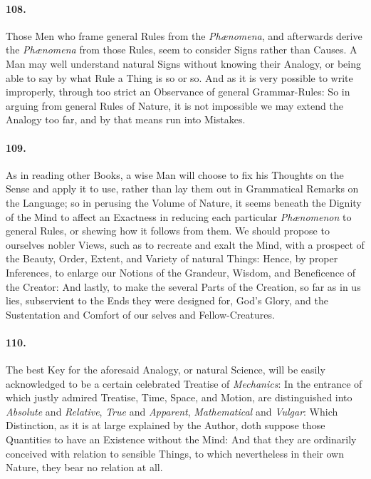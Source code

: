 \documentclass[]{article}
\newenvironment{sectionbody}{}{}
\begin{document}
\begin{sectionbody}
\paragraph{108.} Those Men who frame general Rules from the
\emph{Ph{\ae}nomena}, and afterwards derive the
\emph{Ph{\ae}nomena} from those Rules, seem to consider Signs
rather than Causes.  A Man may well understand natural Signs
without knowing their Analogy, or being able to say by what Rule
a Thing is so or so.  And as it is very possible to write
improperly, through too strict an Observance of general
Grammar-Rules: So in arguing from general Rules of Nature, it is
not impossible we may extend the Analogy too far, and by that
means run into Mistakes.



\paragraph{109.} As in reading other Books, a wise Man will choose to fix his
Thoughts on the Sense and apply it to use, rather than lay them
out in Grammatical Remarks on the Language; so in perusing the
Volume of Nature, it seems beneath the Dignity of the Mind to
affect an Exactness in reducing each particular
\emph{Ph{\ae}nomenon} to general Rules, or shewing how it
follows from them.  We should propose to ourselves nobler Views,
such as to recreate and exalt the Mind, with a prospect of the
Beauty, Order, Extent, and Variety of natural Things: Hence, by
proper Inferences, to enlarge our Notions of the Grandeur,
Wisdom, and Beneficence of the {\sc Creator}: And lastly, to make the
several Parts of the Creation, so far as in us lies, subservient
to the Ends they were designed for, {\sc God}'s Glory, and the
Sustentation and Comfort of our selves and Fellow-Creatures.



\paragraph{110.} The best Key for the aforesaid Analogy, or natural Science, will
be easily acknowledged to be a certain celebrated Treatise of
\emph{Mechanics}: In the entrance of which justly admired
Treatise, Time, Space, and Motion, are distinguished into
\emph{Absolute} and \emph{Relative}, \emph{True} and
\emph{Apparent}, \emph{Mathematical} and \emph{Vulgar}:
Which Distinction, as it is at large explained by the Author,
doth suppose those Quantities to have an Existence without the
Mind: And that they are ordinarily conceived with relation to
sensible Things, to which nevertheless in their own Nature, they
bear no relation at all.




\end{sectionbody}
\end{document}
